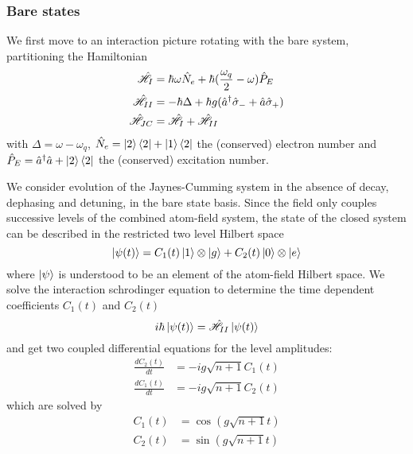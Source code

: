 \subsubsection{Bare states}
We first move to an interaction picture rotating with the bare system, partitioning the Hamiltonian
\begin{align}
	\hat{\mathscr{H}}_I &= \hbar \omega \hat{N}_e + \hbar(\frac{\omega_q}{2}-\omega)\hat{P}_E \\
	\hat{\mathscr{H}}_{II} &= -\hbar \Delta + \hbar g ({\hat{a}^\dagger} \hat{\sigma}_- + \hat{a} \hat{\sigma}_+) \\
	\hat{\mathscr{H}}_{JC} &= \hat{\mathscr{H}}_I+\hat{\mathscr{H}}_{II}
\end{align}
with $\Delta = \omega-\omega_q$,   $\hat{N}_e = \ket{2} \bra{2} + \ket{1} \bra{2} $ the (conserved) electron number and $\hat{P}_E = {\hat{a}^\dagger}\hat{a} + \ket{2}\bra{2} $ the (conserved) excitation number.

We consider evolution of the Jaynes-Cumming system in the absence of decay, dephasing and detuning, in the bare state basis.
Since the field only couples successive levels of the combined atom-field system, the state of the closed system can be described in the restricted two level Hilbert space
\begin{equation}
	\ket{\psi(t)} = C_1(t) \ket{1} \otimes\ket{g} + C_2(t) \ket{0} \otimes\ket{e}
\end{equation}
where $\ket{\psi}$ is understood to be an element of the atom-field Hilbert space.
We solve the interaction schrodinger equation to determine the time dependent coefficients $C_1(t)$ and $C_2(t)$
\begin{equation}
	i \hbar\ket{\psi(t)} = \hat{\mathscr{H}}_{II} \ket{\psi(t)}
\end{equation}
and get two coupled differential equations for the level amplitudes:
\begin{align}
	\frac{d C_2(t)}{dt} &= -i g \sqrt{n+1}C_1(t)\\
	\frac{d C_1(t)}{dt} &= -i g \sqrt{n+1}C_2(t)
\end{align}
which are solved by
\begin{align}
  C_1(t) &= \cos(g\sqrt{n+1}t)\\
  C_2(t) &= \sin(g\sqrt{n+1}t)
\end{align}
